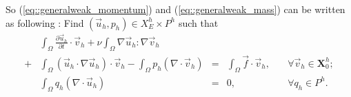 \documentclass[a4paper, 11pt]{article}
\begin{document}
   So (\ref{eq::generalweak_momentum}) and (\ref{eq::generalweak_mass})
    can be written as following : Find
   $(\vec{u}_h, p_h) \in X_E^h \times P^h$ such that
   \begin{equation}
     \begin{aligned}
       &\int_{\Omega}\frac{\partial \vec{u}_h}{\partial t} \cdot \vec{v}_h
       + \nu \int_\Omega \nabla \vec{u}_h : \nabla \vec{v}_h  \\
       + & \int_\Omega \left( \vec{u}_h \cdot \nabla \vec{u}_h \right)
       \cdot \vec{v}_h - \int_\Omega p_h \left( \nabla \cdot \vec{v}_h
       \right) & = &\int_\Omega \vec{f} \cdot \vec{v}_h, &\quad
       \forall \vec{v}_h \in \mathbf{X}_0^h;  \\
       & \int_\Omega q_h \left( \nabla \cdot \vec{u}_h \right) & = &0,&
       \quad \forall q_h \in P^h.
       \label{eq::discreted_weak}
     \end{aligned}
   \end{equation}
\end{document}
